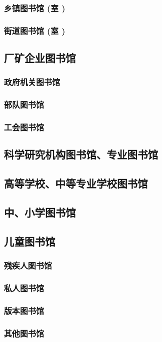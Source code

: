 \documentclass[UTF8]{../../ApplicationUniverse}
\begin{document}
    \subsubsection{乡镇图书馆 (室 )}
    \subsubsection{街道图书馆 (室 )}
\subsection{厂矿企业图书馆}
    \subsubsection{政府机关图书馆}
    \subsubsection{部队图书馆}
    \subsubsection{工会图书馆}
\subsection{科学研究机构图书馆、专业图书馆}
\subsection{高等学校、中等专业学校图书馆}
\subsection{中、小学图书馆}
\subsection{儿童图书馆}
    \subsubsection{残疾人图书馆}
    \subsubsection{私人图书馆}
    \subsubsection{版本图书馆}
    \subsubsection{其他图书馆}
\end{document}
